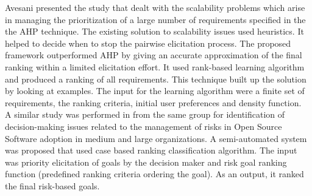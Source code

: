 Avesani \etal\cite{PAvesani} presented the study that dealt with the scalability
problems which arise in managing the prioritization of a large number of
requirements specified in the the AHP technique. The existing solution to
scalability issues used heuristics. It helped to decide when to stop the pairwise
elicitation process. The proposed framework outperformed AHP by giving an
accurate approximation of the final ranking within a limited elicitation effort. It used rank-based
learning algorithm and produced a ranking of all requirements. This technique
built up the solution by looking at examples. The input for the learning
algorithm were a finite set of requirements, the ranking criteria, initial user
preferences and density function.\\

A similar study was performed in \cite{7320432} from the same group
\cite{PAvesani} for identification of decision-making issues related to the
management of risks in Open Source Software adoption in medium and large
organizations. A semi-automated system was proposed that used case based
ranking classification algorithm. The input was priority elicitation of goals by
the decision maker and risk goal ranking function (predefined ranking criteria
ordering the goal). As an output, it ranked the final risk-based goals.\\



